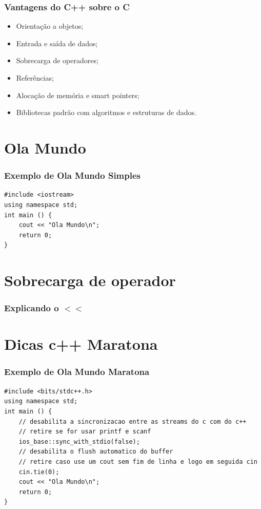 \documentclass[12pt]{beamer}
\begin{document}
\begin{frame}
    \frametitle{Vantagens do C++ sobre o C}
    \begin{itemize}
        \item Orientação a objetos;
        \item Entrada e saída de dados;
        \item Sobrecarga de operadores;
        \item Referências;
        \item Alocação de memória e smart pointers;
        \item Bibliotecas padrão com algoritmos e estruturas de dados.
    \end{itemize}
\end{frame}

\section{Ola Mundo}\label{Ola Mundo}
\begin{frame}[t,fragile]{\insertsectionhead}
    \frametitle{Exemplo de Ola Mundo Simples}
    \begin{lstlisting}
#include <iostream>
using namespace std;
int main () {
    cout << "Ola Mundo\n";
    return 0;
}
    \end{lstlisting}
\end{frame}

\section{Sobrecarga de operador}\label{Sobrecarga de operador}
\begin{frame}
    \frametitle{Explicando o $<<$}
\end{frame}

\section{Dicas c++ Maratona}\label{Dicas c++ Maratona}
\begin{frame}[t,fragile]{\insertsectionhead}
    \frametitle{Exemplo de Ola Mundo Maratona}
    \begin{center}
    \begin{lstlisting}
#include <bits/stdc++.h>
using namespace std;
int main () {
    // desabilita a sincronizacao entre as streams do c com do c++
    // retire se for usar printf e scanf
    ios_base::sync_with_stdio(false);
    // desabilita o flush automatico do buffer
    // retire caso use um cout sem fim de linha e logo em seguida cin
    cin.tie(0);
    cout << "Ola Mundo\n";
    return 0;
}
    \end{lstlisting}
    \end{center}
\end{frame}
\end{document}
